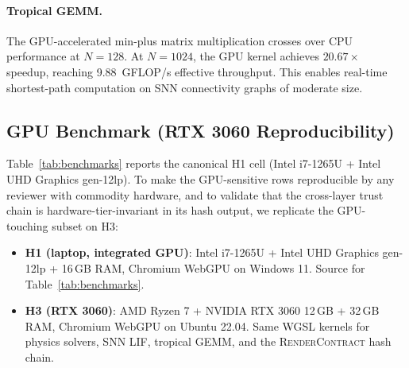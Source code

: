 \documentclass[sigchi-a]{acmart}
\providecommand{\rendercontract}{\textsc{RenderContract}} %
\begin{document}
\paragraph{Tropical GEMM.}
The GPU-accelerated min-plus matrix multiplication crosses over CPU
performance at $N{=}128$. At $N{=}1024$, the GPU kernel achieves
$20.67\times$ speedup, reaching 9.88~GFLOP/s effective throughput. This
enables real-time shortest-path computation on SNN connectivity graphs of
moderate size.

\subsection{GPU Benchmark (RTX 3060 Reproducibility)}
\label{sec:eval:gpu}

Table~\ref{tab:benchmarks} reports the canonical H1 cell (Intel i7-1265U
+ Intel UHD Graphics gen-12lp). To make the GPU-sensitive rows
reproducible by any reviewer with commodity hardware, and to validate
that the cross-layer trust chain is hardware-tier-invariant in its
hash output, we replicate the GPU-touching subset on H3:

\begin{itemize}
  \item \textbf{H1 (laptop, integrated GPU)}: Intel i7-1265U + Intel UHD
    Graphics gen-12lp + 16\,GB RAM, Chromium WebGPU on Windows 11.
    Source for Table~\ref{tab:benchmarks}.
  \item \textbf{H3 (RTX 3060)}: AMD Ryzen 7 + NVIDIA RTX 3060 12\,GB +
    32\,GB RAM, Chromium WebGPU on Ubuntu 22.04. Same WGSL kernels for
    physics solvers, SNN LIF, tropical GEMM, and the
    \rendercontract{} hash chain.
\end{itemize}
\end{document}
